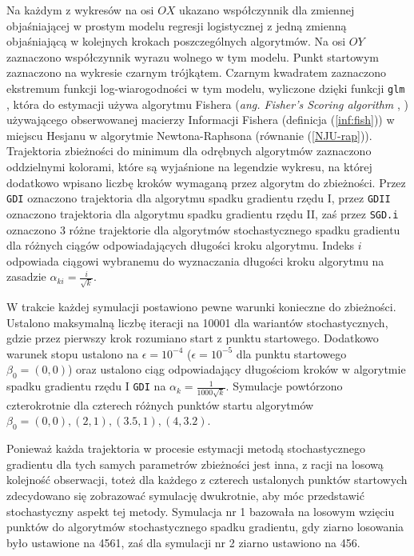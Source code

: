 Na każdym z wykresów na osi $OX$ ukazano współczynnik dla zmiennej objaśniającej w prostym modelu regresji logistycznej z jedną zmienną objaśniającą w kolejnych krokach poszczególnych algorytmów. Na osi $OY$ zaznaczono współczynnik wyrazu wolnego w tym modelu. Punkt startowym zaznaczono na wykresie czarnym trójkątem. Czarnym kwadratem zaznaczono ekstremum funkcji log-wiarogodności w tym modelu, wyliczone dzięki funkcji \texttt{glm} \cite{glmglm}, która do estymacji używa algorytmu Fishera (\textit{ang. Fisher's Scoring algorithm} \cite{scoring1}, \cite{scoring2}) używającego obserwowanej macierzy Informacji Fishera (definicja (\ref{inf:fish})) w miejscu Hesjanu w algorytmie Newtona-Raphsona (równanie (\ref{NJU-rap})). Trajektoria zbieżności do minimum dla odrębnych algorytmów zaznaczono oddzielnymi kolorami, które są wyjaśnione na legendzie wykresu, na której dodatkowo wpisano liczbę kroków wymaganą przez algorytm do zbieżności. Przez \texttt{GDI} oznaczono trajektoria dla algorytmu spadku gradientu rzędu I, przez \texttt{GDII} oznaczono trajektoria dla algorytmu spadku gradientu rzędu II, zaś przez \texttt{SGD.i} oznaczono 3 różne trajektorie dla algorytmów stochastycznego spadku gradientu dla różnych ciągów odpowiadających długości kroku algorytmu. Indeks $i$ odpowiada ciągowi wybranemu do wyznaczania długości kroku algorytmu na zasadzie $\alpha_{ki} = \frac{i}{\sqrt{k}}$.

W trakcie każdej symulacji postawiono pewne warunki konieczne do zbieżności. Ustalono maksymalną liczbę iteracji na 10001 dla wariantów stochastycznych, gdzie przez pierwszy krok rozumiano start z punktu startowego. Dodatkowo warunek stopu ustalono na $\epsilon=10^{-4}$ ($\epsilon=10^{-5}$ dla punktu startowego $\beta_0 = (0,0)$) oraz ustalono ciąg odpowiadający długościom kroków w algorytmie spadku gradientu rzędu I \texttt{GDI} na $\alpha_{k} = \frac{1}{1000\sqrt{k}}$. Symulacje powtórzono czterokrotnie dla czterech różnych punktów startu algorytmów $\beta_0 = (0,0), (2,1), (3.5,1), (4,3.2).$

Ponieważ każda trajektoria w procesie estymacji metodą stochastycznego gradientu dla tych samych parametrów zbieżności jest inna, z racji na losową kolejność obserwacji, toteż dla każdego z czterech ustalonych punktów startowych zdecydowano się zobrazować symulację dwukrotnie, aby móc przedstawić stochastyczny aspekt tej metody. Symulacja nr 1 bazowała na losowym wzięciu punktów do algorytmów stochastycznego spadku gradientu, gdy ziarno losowania było ustawione na 4561, zaś dla symulacji nr 2 ziarno ustawiono na 456.

